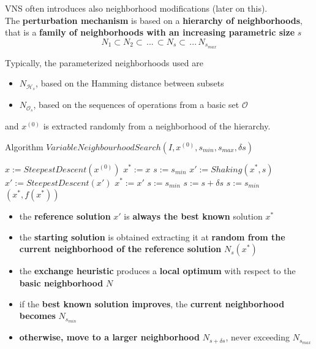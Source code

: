 VNS often introduces also neighborhood modifications (later on this).\\

The \textbf{perturbation mechanism} is based on a \textbf{hierarchy of neighborhoods}, that is a \textbf{family of neighborhoods with an increasing parametric size} $s$
$$ N_1 \subset N_2 \subset \, ... \, \subset N_s \subset \, ... \, N_{s_{max}} $$


Typically, the parameterized neighborhoods used are
\begin{itemize}
	\item $N_{\mathcal{H}_s}$, based on the Hamming distance between subsets
	
	\item $N_{\mathcal{O}_s}$, based on the sequences of operations from a basic set $\mathcal{O}$
\end{itemize}

and $x^{(0)}$ is extracted randomly from a neighborhood of the hierarchy.\\

\newpage

\begin{algorithm}
	\caption{Algorithm $VariableNeighbourhoodSearch(I , x^{(0)}, s_{min}, s_{max}, \delta s)$}
	\begin{algorithmic}
		\STATE $x := SteepestDescent(x^{(0)})$ 
		\STATE $x^\ast := x$
		\STATE $s := s_{min}$
		\STATE $x' := Shaking(x^\ast, s)$
		\STATE $x' := SteepestDescent(x')$
		\STATE $x^\ast := x'$
		\STATE $s := s_{min}$
		\ELSE 
		\STATE $s := s + \delta s$
		\ENDIF
		\STATE $s := s_{min}$
		\ENDIF
		\ENDFOR
		\RETURN $(x^\ast, f (x^\ast))$
	\end{algorithmic}
\end{algorithm}

\begin{itemize}
	\item the \textbf{reference solution} $x'$ is \textbf{always the best known} solution $x^\ast$
	
	\item the \textbf{starting solution} is obtained extracting it at \textbf{random from the current neighborhood of the reference solution} $N_s (x^\ast)$
	
	\item the \textbf{exchange heuristic} produces a \textbf{local optimum} with respect to the \textbf{basic neighborhood} $N$
	
	\item if the \textbf{best known solution improves}, the \textbf{current neighborhood becomes} $N_{s_{min}}$
	
	\item \textbf{otherwise, move to a larger neighborhood} $N_{s+\delta s}$, never exceeding $N_{s_{max}}$
\end{itemize}

